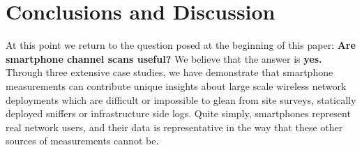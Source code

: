\section{Conclusions and Discussion}
\label{sec:conclusion}

At this point we return to the question posed at the beginning of this paper:
\textbf{Are smartphone channel scans useful?} We believe that the answer is
\textbf{yes.} Through three extensive case studies, we have demonstrate that
smartphone measurements can contribute unique insights about large scale
wireless network deployments which are difficult or impossible to glean from
site surveys, statically deployed sniffers or infrastructure side logs. Quite
simply, smartphones represent real network users, and their data is
representative in the way that these other sources of measurements cannot be.

